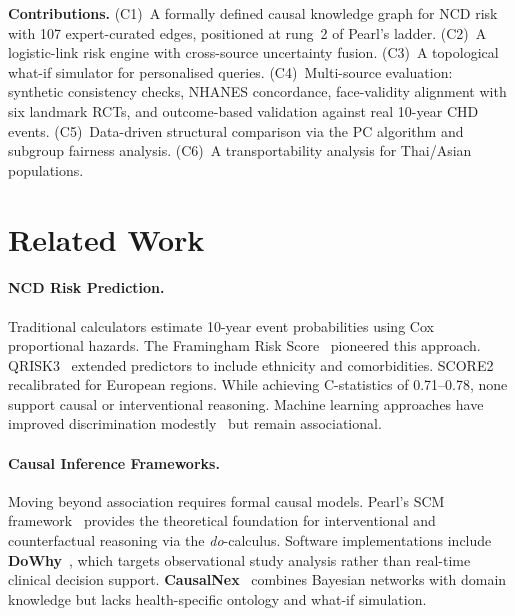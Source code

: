 \documentclass[runningheads]{llncs}
\begin{document}
\noindent\textbf{Contributions.}
(C1)~A formally defined causal knowledge graph for NCD risk with 107
expert-curated edges, positioned at rung~2 of Pearl's ladder.
(C2)~A logistic-link risk engine with cross-source uncertainty fusion.
(C3)~A topological what-if simulator for personalised queries.
(C4)~Multi-source evaluation: synthetic consistency checks, NHANES
concordance, face-validity alignment with six landmark RCTs,
and outcome-based validation against real 10-year CHD events.
(C5)~Data-driven structural comparison via the PC algorithm and
subgroup fairness analysis.
(C6)~A transportability analysis for Thai/Asian populations.

\section{Related Work}\label{sec:related}

\paragraph{NCD Risk Prediction.}
Traditional calculators estimate 10-year event probabilities using Cox
proportional hazards.
The Framingham Risk Score~\cite{dagostino2008} pioneered this
approach.
QRISK3~\cite{hippisley2017qrisk3} extended predictors to include
ethnicity and comorbidities.
SCORE2~\cite{score22021} recalibrated for European regions.
While achieving C-statistics of 0.71--0.78, none support causal or
interventional reasoning.
Machine learning approaches have improved discrimination
modestly~\cite{alaa2019attentive} but remain associational.

\paragraph{Causal Inference Frameworks.}
Moving beyond association requires formal causal models.
Pearl's SCM framework~\cite{pearl2009causality} provides the
theoretical foundation for interventional and counterfactual
reasoning via the \emph{do}-calculus.
Software implementations include \textbf{DoWhy}~\cite{sharma2020dowhy},
which targets observational study analysis rather than real-time
clinical decision support.
\textbf{CausalNex}~\cite{beaumont2021causalnex} combines Bayesian
networks with domain knowledge but lacks health-specific ontology
and what-if simulation.
\end{document}
